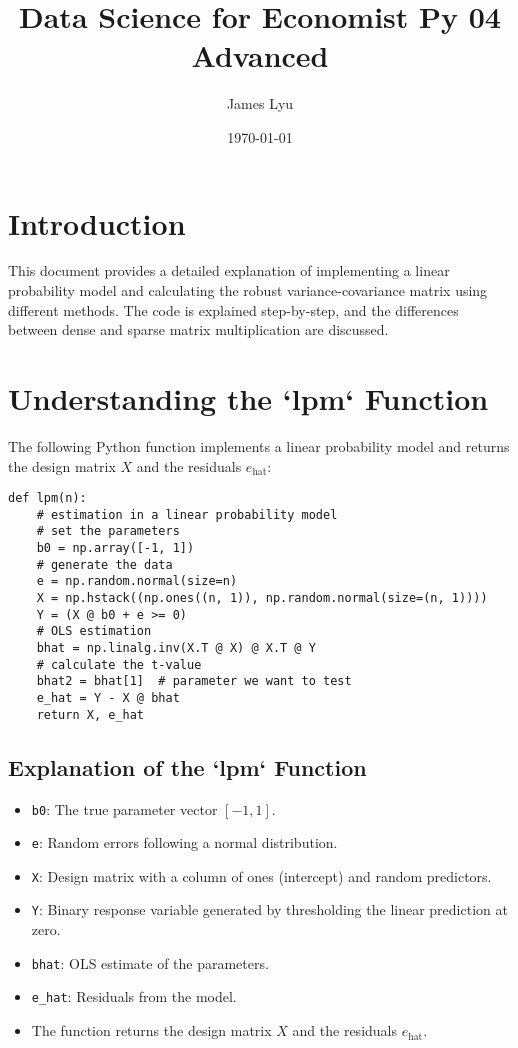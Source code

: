 \documentclass{article}
\title{Data Science for Economist Py 04 Advanced}
\author{James Lyu}
\date{\today}
\begin{document}
\maketitle

\section{Introduction}
This document provides a detailed explanation of implementing a linear probability model and calculating the robust variance-covariance matrix using different methods. The code is explained step-by-step, and the differences between dense and sparse matrix multiplication are discussed.

\section{Understanding the `lpm` Function}

The following Python function implements a linear probability model and returns the design matrix \(X\) and the residuals \(e_{\text{hat}}\):

\begin{lstlisting}[caption={Linear Probability Model Function}, label={lst:lpm_function}]
def lpm(n):
    # estimation in a linear probability model
    # set the parameters
    b0 = np.array([-1, 1])
    # generate the data
    e = np.random.normal(size=n)
    X = np.hstack((np.ones((n, 1)), np.random.normal(size=(n, 1))))
    Y = (X @ b0 + e >= 0)
    # OLS estimation
    bhat = np.linalg.inv(X.T @ X) @ X.T @ Y
    # calculate the t-value
    bhat2 = bhat[1]  # parameter we want to test
    e_hat = Y - X @ bhat
    return X, e_hat
\end{lstlisting}

\subsection{Explanation of the `lpm` Function}
\begin{itemize}
    \item \texttt{b0}: The true parameter vector \([-1, 1]\).
    \item \texttt{e}: Random errors following a normal distribution.
    \item \texttt{X}: Design matrix with a column of ones (intercept) and random predictors.
    \item \texttt{Y}: Binary response variable generated by thresholding the linear prediction at zero.
    \item \texttt{bhat}: OLS estimate of the parameters.
    \item \texttt{e\_hat}: Residuals from the model.
    \item The function returns the design matrix \(X\) and the residuals \(e_{\text{hat}}\).
\end{itemize}
\end{document}
